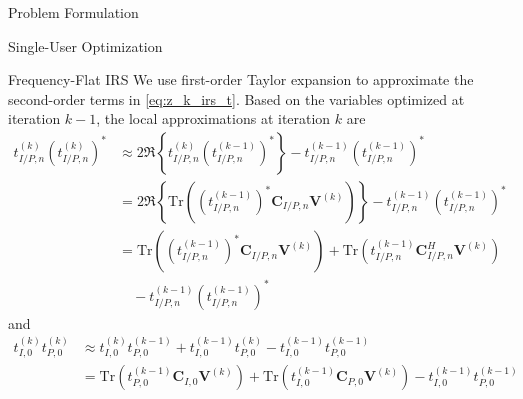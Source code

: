 \documentclass{IEEEtran}
\begin{document}
\begin{section}{Problem Formulation}
\begin{subsection}{Single-User Optimization}
\begin{subsubsection}{Frequency-Flat IRS}
			We use first-order Taylor expansion to approximate the second-order terms in \ref{eq:z_k_irs_t}. Based on the variables optimized at iteration $k - 1$, the local approximations at iteration $k$ are \cite{Adali2010}
			\begin{equation}
				\begin{split}
					t_{I/P,n}^{(k)} (t_{I/P,n}^{(k)})^*
					& \approx 2 \Re\left\{t_{I/P,n}^{(k)} (t_{I/P,n}^{(k-1)})^*\right\} - t_{I/P,n}^{(k-1)} (t_{I/P,n}^{(k-1)})^* \\
					& = 2 \Re \left\{\mathrm{Tr}\left((t_{I/P,n}^{(k-1)})^*\boldsymbol{C}_{I/P,n}\boldsymbol{V}^{(k)}\right)\right\} - t_{I/P,n}^{(k-1)} (t_{I/P,n}^{(k-1)})^*\\
					& = \mathrm{Tr}\left((t_{I/P,n}^{(k-1)})^*\boldsymbol{C}_{I/P,n}\boldsymbol{V}^{(k)}\right) + \mathrm{Tr}(t_{I/P,n}^{(k-1)}\boldsymbol{C}_{I/P,n}^H\boldsymbol{V}^{(k)})\\
					& \quad- t_{I/P,n}^{(k-1)} (t_{I/P,n}^{(k-1)})^*
				\end{split}
			\end{equation}
			and
			\begin{equation}
				\begin{split}
					t_{I,0}^{(k)} t_{P,0}^{(k)}
					& \approx t_{I,0}^{(k)} t_{P,0}^{(k-1)} + t_{I,0}^{(k-1)} t_{P,0}^{(k)} - t_{I,0}^{(k-1)} t_{P,0}^{(k-1)}\\
					& = \mathrm{Tr}(t_{P,0}^{(k-1)}\boldsymbol{C}_{I,0}\boldsymbol{V}^{(k)}) + \mathrm{Tr}(t_{I,0}^{(k-1)}\boldsymbol{C}_{P,0}\boldsymbol{V}^{(k)}) - t_{I,0}^{(k-1)} t_{P,0}^{(k-1)}
				\end{split}
			\end{equation}

\end{subsubsection}
\end{subsection}
\end{section}
\end{document}
